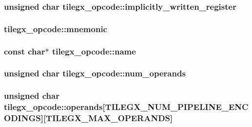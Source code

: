 \subsubsection[{\texorpdfstring{implicitly\+\_\+written\+\_\+register}{implicitly_written_register}}]{\setlength{\rightskip}{0pt plus 5cm}unsigned char tilegx\+\_\+opcode\+::implicitly\+\_\+written\+\_\+register}\hypertarget{structtilegx__opcode_a5267f00695fd0ecd271e2e0a069b171a}{}\label{structtilegx__opcode_a5267f00695fd0ecd271e2e0a069b171a}
\subsubsection[{\texorpdfstring{mnemonic}{mnemonic}}]{ tilegx\+\_\+opcode\+::mnemonic}\hypertarget{structtilegx__opcode_a5c6605c6327f193d3eb1bc2d58d2cbfd}{}\label{structtilegx__opcode_a5c6605c6327f193d3eb1bc2d58d2cbfd}
\subsubsection[{\texorpdfstring{name}{name}}]{\setlength{\rightskip}{0pt plus 5cm}const char$\ast$ tilegx\+\_\+opcode\+::name}\hypertarget{structtilegx__opcode_a3c82f02ce7888483afa4d5d101f0c220}{}\label{structtilegx__opcode_a3c82f02ce7888483afa4d5d101f0c220}
\subsubsection[{\texorpdfstring{num\+\_\+operands}{num_operands}}]{\setlength{\rightskip}{0pt plus 5cm}unsigned char tilegx\+\_\+opcode\+::num\+\_\+operands}\hypertarget{structtilegx__opcode_a2b6e28a77cfbe70c378e4ad91ff695cd}{}\label{structtilegx__opcode_a2b6e28a77cfbe70c378e4ad91ff695cd}
\subsubsection[{\texorpdfstring{operands}{operands}}]{\setlength{\rightskip}{0pt plus 5cm}unsigned char tilegx\+\_\+opcode\+::operands\mbox{[}{\bf T\+I\+L\+E\+G\+X\+\_\+\+N\+U\+M\+\_\+\+P\+I\+P\+E\+L\+I\+N\+E\+\_\+\+E\+N\+C\+O\+D\+I\+N\+GS}\mbox{]}\mbox{[}{\bf T\+I\+L\+E\+G\+X\+\_\+\+M\+A\+X\+\_\+\+O\+P\+E\+R\+A\+N\+DS}\mbox{]}}\hypertarget{structtilegx__opcode_ad6ab82aa4bbc6df07d4ce9372b61504b}{}\label{structtilegx__opcode_ad6ab82aa4bbc6df07d4ce9372b61504b}
